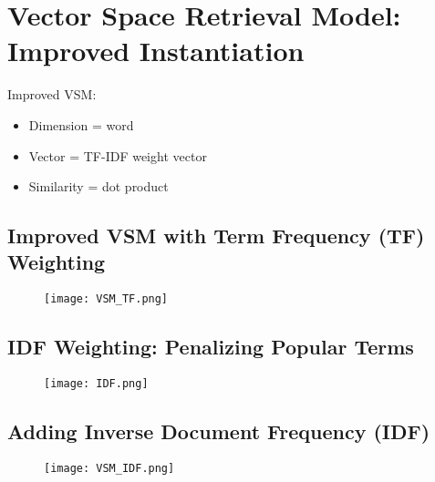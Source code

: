 \section{Vector Space Retrieval Model: Improved Instantiation}

Improved VSM:
\begin{itemize}
\item Dimension = word
\item Vector = TF-IDF weight vector
\item Similarity = dot product
\end{itemize}

\subsection{Improved VSM with Term Frequency (TF) Weighting}
\begin{figure}[H]
    \centering
    \texttt{[image: VSM\_TF.png]}
\end{figure}


\subsection{IDF Weighting: Penalizing Popular Terms}
\begin{figure}[H]
    \centering
    \texttt{[image: IDF.png]}
\end{figure}


\subsection{Adding Inverse Document Frequency (IDF)}
\begin{figure}[H]
    \centering
    \texttt{[image: VSM\_IDF.png]}
\end{figure}

